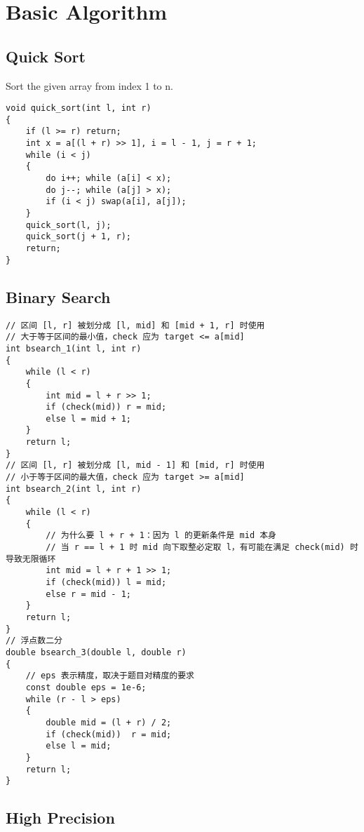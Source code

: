 \chapter{Basic Algorithm}\label{chap:BasicAlgorithm}

\section{Quick Sort}

Sort the given array from index 1 to n.

\begin{lstlisting}
void quick_sort(int l, int r)
{
    if (l >= r) return;
    int x = a[(l + r) >> 1], i = l - 1, j = r + 1;
    while (i < j)
    {
        do i++; while (a[i] < x);
        do j--; while (a[j] > x);
        if (i < j) swap(a[i], a[j]);
    }
    quick_sort(l, j);
    quick_sort(j + 1, r);
    return;
}
\end{lstlisting}

\section{Binary Search}

\begin{lstlisting}
// 区间 [l, r] 被划分成 [l, mid] 和 [mid + 1, r] 时使用
// 大于等于区间的最小值，check 应为 target <= a[mid]
int bsearch_1(int l, int r)
{
    while (l < r)
    {
        int mid = l + r >> 1;
        if (check(mid)) r = mid;
        else l = mid + 1;
    }
    return l;
}
// 区间 [l, r] 被划分成 [l, mid - 1] 和 [mid, r] 时使用
// 小于等于区间的最大值，check 应为 target >= a[mid]
int bsearch_2(int l, int r)
{
    while (l < r)
    {
        // 为什么要 l + r + 1：因为 l 的更新条件是 mid 本身
        // 当 r == l + 1 时 mid 向下取整必定取 l，有可能在满足 check(mid) 时导致无限循环
        int mid = l + r + 1 >> 1;
        if (check(mid)) l = mid;
        else r = mid - 1;
    }
    return l;
}
// 浮点数二分
double bsearch_3(double l, double r)
{
    // eps 表示精度，取决于题目对精度的要求
    const double eps = 1e-6;
    while (r - l > eps)
    {
        double mid = (l + r) / 2;
        if (check(mid))  r = mid;
        else l = mid;
    }
    return l;
}
\end{lstlisting}

\section{High Precision}
